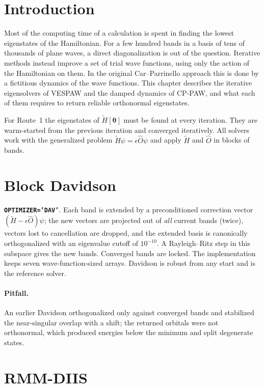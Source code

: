 \documentclass[11pt,a4paper,oneside]{book}
\newcommand{\vth}{\bm\theta}
\newcommand{\key}[1]{\textbf{\texttt{#1}}}
\begin{document}
\section{Introduction}

Most of the computing time of a calculation is spent in finding the
lowest eigenstates of the Hamiltonian. For a few hundred bands in a
basis of tens of thousands of plane waves, a direct diagonalization is
out of the question. Iterative methods instead improve a set of trial
wave functions, using only the action of the Hamiltonian on them. In
the original Car--Parrinello approach this is done by a fictitious
dynamics of the wave functions. This chapter describes the iterative
eigensolvers of VESPAW and the damped dynamics of CP-PAW, and what each
of them requires to return reliable orthonormal eigenstates.


For Route~1 the eigenstates of $\tilde H[\vth]$ must be found at every
iteration. They are warm-started from the previous iteration and
converged iteratively. All solvers work with the generalized problem
$\tilde H\psi=\epsilon\hat O\psi$ and apply $\tilde H$ and $\hat O$ in
blocks of bands.

\section{Block Davidson}

\key{OPTIMIZER='DAV'}. Each band is extended by a preconditioned
correction vector $(\tilde H-\epsilon\hat O)\psi$; the new vectors are
projected out of \emph{all} current bands (twice), vectors lost to
cancellation are dropped, and the extended basis is canonically
orthogonalized with an eigenvalue cutoff of $10^{-10}$. A Rayleigh--Ritz
step in this subspace gives the new bands. Converged bands are locked.
The implementation keeps seven wave-function-sized arrays. Davidson is
robust from any start and is the reference solver.

\paragraph{Pitfall.} An earlier Davidson orthogonalized only against
converged bands and stabilized the near-singular overlap with a shift;
the returned orbitals were not orthonormal, which produced energies below
the minimum and split degenerate states.

\section{RMM-DIIS}
\end{document}
